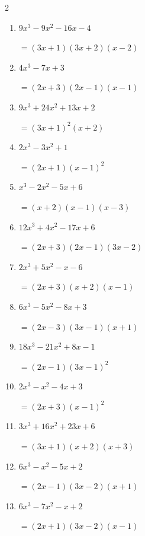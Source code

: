 \begin{multicols}{2}
\begin{enumerate}
        $=(2x-3)(3x-1)(x+1)$

  \item $9x^{3}-9x^{2}-16x-4$

        $=(3x+1)(3x+2)(x-2)$

\columnbreak %

  \item $4x^{3}-7x+3$

        $=(2x+3)(2x-1)(x-1)$

  \item $9x^{3}+24x^{2}+13x+2$

        $=(3x+1) ^{ 2 }(x+2)$

  \item $2x^{3}-3x^{2}+1$

        $=(2x+1)(x-1) ^{ 2 }$

  \item $x^{3}-2x^{2}-5x+6$

        $=(x+2)(x-1)(x-3)$

  \item $12x^{3}+4x^{2}-17x+6$

        $=(2x+3)(2x-1)(3x-2)$

\columnbreak %

\resetques

  \item $2x^{3}+5x^{2}-x-6$

        $=(2x+3)(x+2)(x-1)$

  \item $6x^{3}-5x^{2}-8x+3$

        $=(2x-3)(3x-1)(x+1)$

  \item $18x^{3}-21x^{2}+8x-1$

        $=(2x-1)(3x-1) ^{ 2 }$

  \item $2x^{3}-x^{2}-4x+3$

        $=(2x+3)(x-1) ^{ 2 }$

  \item $3x^{3}+16x^{2}+23x+6$

        $=(3x+1)(x+2)(x+3)$

\columnbreak %

  \item $6x^{3}-x^{2}-5x+2$

        $=(2x-1)(3x-2)(x+1)$

  \item $6x^{3}-7x^{2}-x+2$

        $=(2x+1)(3x-2)(x-1)$


\end{enumerate}
\end{multicols}
